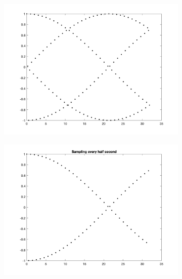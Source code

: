 \documentclass[12pt]{article}
\begin{document}
\begin{figure}[h!]
\centering

\begin{subfigure}{0.49\columnwidth}
\centering
\includegraphics[width=\textwidth]{problem_5_1.png}
\caption{}
\label{fig:time1}
\end{subfigure}\hfill
\begin{subfigure}{0.49\columnwidth}
\centering
\includegraphics[width=\textwidth]{problem_5_2.png}
\caption{}
\label{fig:time2}
\end{subfigure}

\medskip


\end{figure}
\end{document}
